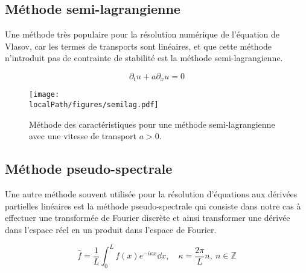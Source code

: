 \subsection{Méthode semi-lagrangienne}

Une méthode très populaire pour la résolution numérique de l'équation de Vlasov, car les termes de transports sont linéaires, et que cette méthode n'introduit pas de contrainte de stabilité est la méthode semi-lagrangienne.

$$
  \partial_t u + a\partial_xu = 0
$$

\begin{figure}[h]
  \centering
  \texttt{[image: \\localPath/figures/semilag.pdf]}
  \caption{Méthode des caractéristiques pour une méthode semi-lagrangienne avec une vitesse de transport $a>0$. }
  \label{fig:intro:semilag}
\end{figure}


\subsection{Méthode pseudo-spectrale}

Une autre méthode souvent utilisée pour la résolution d'équations aux dérivées partielles linéaires est la méthode pseudo-spectrale qui consiste dans notre cas à effectuer une transformée de Fourier discrète et ainsi transformer une dérivée dans l'espace réel en un produit dans l'espace de Fourier.

$$
  \hat{f} = \frac{1}{L}\int_0^L f(x)e^{-i\kappa x}\dd{x},\quad\kappa=\frac{2\pi}{L}n,\ n\in\mathbb{Z}
$$

